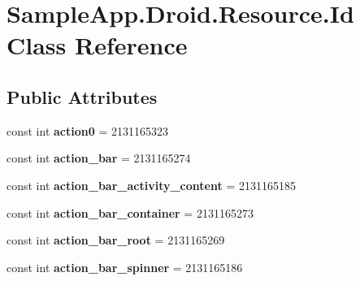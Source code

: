 \hypertarget{class_sample_app_1_1_droid_1_1_resource_1_1_id}{}\section{Sample\+App.\+Droid.\+Resource.\+Id Class Reference}
\label{class_sample_app_1_1_droid_1_1_resource_1_1_id}
\subsection*{Public Attributes}
\begin{DoxyCompactItemize}
\item 
\mbox{\label{class_sample_app_1_1_droid_1_1_resource_1_1_id_a1a3db031e4301f7bd840651cc3ac56aa}} 
const int {\bfseries action0} = 2131165323
\item 
\mbox{\label{class_sample_app_1_1_droid_1_1_resource_1_1_id_a0f55833a34c633308f30c0910ab983c5}} 
const int {\bfseries action\+\_\+bar} = 2131165274
\item 
\mbox{\label{class_sample_app_1_1_droid_1_1_resource_1_1_id_a06266a7be423d47eecd57fca8bcd4361}} 
const int {\bfseries action\+\_\+bar\+\_\+activity\+\_\+content} = 2131165185
\item 
\mbox{\label{class_sample_app_1_1_droid_1_1_resource_1_1_id_a8ea74a6aefe693915e7b6a666329ada7}} 
const int {\bfseries action\+\_\+bar\+\_\+container} = 2131165273
\item 
\mbox{\label{class_sample_app_1_1_droid_1_1_resource_1_1_id_aa8abb9e60abc34a0d78a5661198e9da2}} 
const int {\bfseries action\+\_\+bar\+\_\+root} = 2131165269
\item 
\mbox{\label{class_sample_app_1_1_droid_1_1_resource_1_1_id_a11adb9e4e1e84c13bda5105ce3657320}} 
const int {\bfseries action\+\_\+bar\+\_\+spinner} = 2131165186
\item 
\mbox{\label{class_sample_app_1_1_droid_1_1_resource_1_1_id_acc7d09f6d1fe35fd5b3f818d6a1ed7f2}} 

\end{DoxyCompactItemize}
